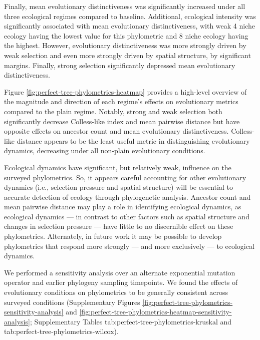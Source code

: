 Finally, mean evolutionary distinctiveness was significantly increased under all three ecological regimes compared to baseline.
Additional, ecological intensity was significantly associated with mean evolutionary distinctiveness, with weak 4 niche ecology having the lowest value for this phylometric and 8 niche ecology having the highest.
However, evolutionary distinctiveness was more strongly driven by weak selection and even more strongly driven by spatial structure, by significant margins.
Finally, strong selection significantly depressed mean evolutionary distinctiveness. 



Figure \ref{fig:perfect-tree-phylometrics-heatmap} provides a high-level overview of the magnitude and direction of each regime's effects on evolutionary metrics compared to the plain regime.
Notably, strong and weak selection both significantly decrease Colless-like index and mean pairwise distance but have opposite effects on ancestor count and mean evolutionary distinctiveness.
Colless-like distance appears to be the least useful metric in distinguishing evolutionary dynamics, decreasing under all non-plain evolutionary conditions.

Ecological dynamics have significant, but relatively weak, influence on the surveyed phylometrics.
So, it appears careful accounting for other evolutionary dynamics (i.e., selection pressure and spatial structure) will be essential to accurate detection of ecology through phylogenetic analysis.
Ancestor count and mean pairwise distance may play a role in identifying ecological dynamics, as ecological dynamics --- in contrast to other factors such as spatial structure and changes in selection pressure --- have little to no discernible effect on these phylometrics. 
Alternately, in future work it may be possible to develop phylometrics that respond more strongly --- and more exclusively --- to ecological dynamics.

We performed a sensitivity analysis over an alternate exponential mutation operator and earlier phylogeny sampling timepoints.
We found the effects of evolutionary conditions on phylometrics to be generally consistent across surveyed conditions (Supplementary Figures \ref{fig:perfect-tree-phylometrics-sensitivity-analysis} and \ref{fig:perfect-tree-phylometrics-heatmap-sensitivity-analysis}; Supplementary Tables tab:perfect-tree-phylometrics-kruskal and tab:perfect-tree-phylometrics-wilcox). 

